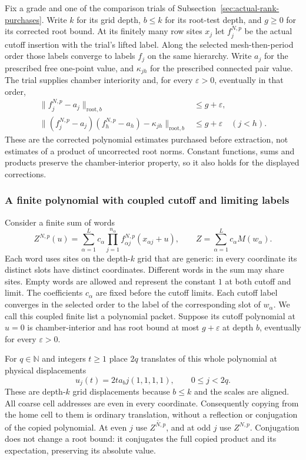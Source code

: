 Fix a grade and one of the comparison trials of
Subsection~\ref{sec:actual-rank-purchases}. Write $k$ for its grid depth,
$b\leq k$ for its root-test depth, and $g\geq0$ for its corrected root
bound. At its finitely many row sites $x_j$ let $f_j^{N,p}$ be the
actual cutoff insertion with the trial's lifted label. Along the
selected mesh-then-period order those labels converge to labels $f_j$
on the same hierarchy. Write $a_j$ for the prescribed free one-point
value, and $\kappa_{jh}$ for the prescribed connected pair value.
The trial supplies chamber interiority and, for every $\varepsilon>0$,
eventually in that order,
\begin{align}
 \|f_j^{N,p}-a_j\|_{\mathrm{root},b}&\leq g+\varepsilon,
                                                        \label{eq:episode-root-one}\\
 \|(f_j^{N,p}-a_j)(f_h^{N,p}-a_h)-\kappa_{jh}\|_{\mathrm{root},b}
       &\leq g+\varepsilon\quad(j<h).                   \label{eq:episode-root-two}
\end{align}
These are the corrected polynomial estimates purchased before extraction,
not estimates of a product of uncorrected root norms. Constant functions,
sums and products preserve the chamber-interior property, so it also
holds for the displayed corrections.

\subsubsection{A finite polynomial with coupled cutoff and limiting labels}

Consider a finite sum of words
\[
 Z^{N,p}(u)=\sum_{\alpha=1}^L c_\alpha
     \prod_{j=1}^{n_\alpha}
       f_{\alpha j}^{N,p}(x_{\alpha j}+u),
 \qquad Z=\sum_{\alpha=1}^L c_\alpha M(w_\alpha).
\]
Each word uses sites on the depth-$k$ grid that are generic: in every
coordinate its distinct slots have distinct coordinates. Different words
in the sum may share sites. Empty words are allowed and represent the
constant $1$ at both cutoff and limit. The coefficients $c_\alpha$ are
fixed before the cutoff limits. Each cutoff label converges in the
selected order to the label of the corresponding slot of $w_\alpha$.
We call this coupled finite list a polynomial packet. Suppose its
cutoff polynomial at $u=0$ is chamber-interior and has root bound at most
$g+\varepsilon$ at depth $b$, eventually for every $\varepsilon>0$.

For $q\in\mathbb N$ and integers $t\geq1$ place $2q$ translates of this whole polynomial at
physical displacements
\[
                   u_j(t)=2ta_bj(1,1,1,1),\qquad 0\leq j<2q.
\]
These are depth-$k$ grid displacements because $b\leq k$ and the scales
are aligned. All coarse cell addresses are even in every coordinate.
Consequently copying from the home cell to them is ordinary translation,
without a reflection or conjugation of the copied polynomial. At even
$j$ use $\overline{Z^{N,p}}$, and at odd $j$ use $Z^{N,p}$.
Conjugation does not change a root bound: it conjugates the full copied
product and its expectation, preserving its absolute value.

